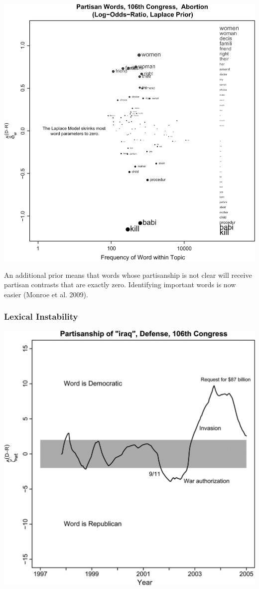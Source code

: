 \documentclass[11pt,compress,professionalfonts]{beamer}
\begin{document}
\begin{frame}[t,fragile]
\newpage
\centerline{\includegraphics[scale=.1]{pictures/fightin1}}

{\footnotesize An additional prior means that words whose partisanship is not clear will receive partisan contrasts that are exactly zero. Identifying important words is now easier (Monroe et al. 2009).}

\end{frame}
\begin{frame}[t,fragile]\frametitle{Lexical Instability}

\centerline{\includegraphics[scale=.1]{pictures/fightin2}}


\end{frame}
\end{document}
